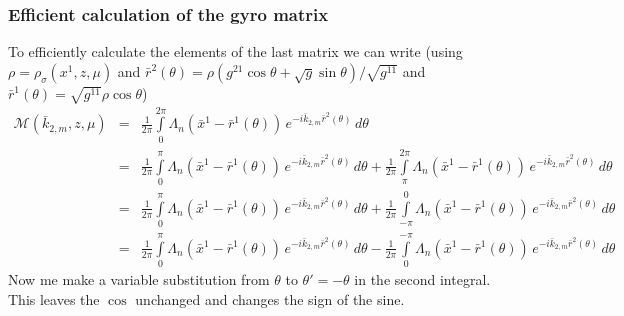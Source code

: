 \subsubsection{Efficient calculation of the gyro matrix}
To efficiently calculate the elements of the last matrix we can write
(using $\rho=\rho_\sigma(x^1,z,\mu)$ and $\bar{r}^2(\theta)=\rho \left(
      g^{21} \cos\theta+\sqrt{g} \sin\theta
    \right)/\sqrt{g^{11}}$ and $\bar{r}^1(\theta)=\sqrt{g^{11}} \rho\cos\theta$)
\begin{eqnarray*}
  \mathcal{M}(\bar{k}_{2,m},z,\mu) &=&\frac{1}{2\pi}\int\limits_0^{2\pi} 
  \Lambda_n(\bar x^1-\bar{r}^1(\theta))\,e^{
    -i\bar k_{2,m}\bar{r}^2(\theta)
  }\,d\theta\\
  &=&\frac{1}{2\pi}\int\limits_0^{\pi} 
  \Lambda_n(\bar x^1-\bar{r}^1(\theta))\,e^{
    -i\bar k_{2,m}\bar{r}^2(\theta)
  }\,d\theta
  +\frac{1}{2\pi}\int\limits_\pi^{2\pi} 
  \Lambda_n(\bar x^1-\bar{r}^1(\theta))\,e^{
    -i\bar k_{2,m}\bar{r}^2(\theta)
  }\,d\theta\\
  &=&\frac{1}{2\pi}\int\limits_0^{\pi} 
  \Lambda_n(\bar x^1-\bar{r}^1(\theta))\,e^{
    -i\bar k_{2,m}\bar{r}^2(\theta)
  }\,d\theta
  +\frac{1}{2\pi}\int\limits_{-\pi}^{0} 
  \Lambda_n(\bar x^1-\bar{r}^1(\theta))\,e^{
    -i\bar k_{2,m}\bar{r}^2(\theta)
  }\,d\theta\\
  &=&\frac{1}{2\pi}\int\limits_0^{\pi} 
  \Lambda_n(\bar x^1-\bar{r}^1(\theta))\,e^{
    -i\bar k_{2,m}\bar{r}^2(\theta)
  }\,d\theta
  -\frac{1}{2\pi}\int\limits_0^{-\pi}
  \Lambda_n(\bar x^1-\bar{r}^1(\theta))\,e^{
    -i\bar k_{2,m}\bar{r}^2(\theta)
  }\,d\theta
\end{eqnarray*}
Now me make a variable substitution from $\theta$ to
$\theta'=-\theta$ in the second integral. This leaves the $\cos$ unchanged and changes the
sign of the sine.
